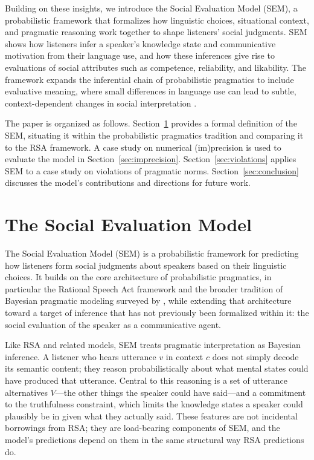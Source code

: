 \documentclass[12pt,a4paper]{article}
\begin{document}
Building on these insights, we introduce the Social Evaluation Model (SEM), a
probabilistic framework that formalizes how linguistic choices, situational
context, and pragmatic reasoning work together to shape listeners' social
judgments. SEM shows how listeners infer a speaker's knowledge state and
communicative motivation from their language use, and how these inferences give
rise to evaluations of social attributes such as competence, reliability, and
likability. The framework expands the inferential chain of probabilistic
pragmatics to include evaluative meaning, where small differences in language
use can lead to subtle, context-dependent changes in social interpretation
\citep[e.g.,][]{beltramapapafragou2023}.

The paper is organized as follows. Section~\ref{sec:sem} provides a formal
definition of the SEM, situating it within the probabilistic pragmatics
tradition and comparing it to the RSA framework. A case study on numerical
(im)precision is used to evaluate the model in Section~\ref{sec:imprecision}.
Section~\ref{sec:violations} applies SEM to a case study on violations of
pragmatic norms. Section~\ref{sec:conclusion} discusses the model's
contributions and directions for future work.


\section{The Social Evaluation Model}
\label{sec:sem}

The Social Evaluation Model (SEM) is a probabilistic framework for predicting
how listeners form social judgments about speakers based on their linguistic
choices. It builds on the core architecture of probabilistic pragmatics, in
particular the Rational Speech Act framework \citep{frank2012,goodman2016} and
the broader tradition of Bayesian pragmatic modeling surveyed by
\citet{franke2016}, while extending that architecture toward a target of
inference that has not previously been formalized within it: the social
evaluation of the speaker as a communicative agent.

Like RSA and related models, SEM treats pragmatic interpretation as Bayesian
inference. A listener who hears utterance $v$ in context $c$ does not simply
decode its semantic content; they reason probabilistically about what mental
states could have produced that utterance. Central to this reasoning is a set of
utterance alternatives $V$---the other things the speaker could have said---and
a commitment to the truthfulness constraint, which limits the knowledge states a
speaker could plausibly be in given what they actually said. These features are
not incidental borrowings from RSA; they are load-bearing components of SEM, and
the model's predictions depend on them in the same structural way RSA predictions
do.
\end{document}
